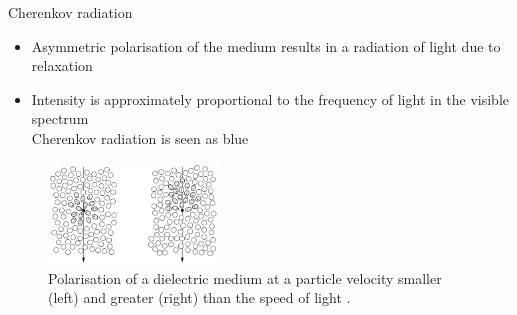 \documentclass[aspectratio=1610, 10pt]{beamer}
\begin{document}
\begin{frame}{Cherenkov radiation}
  \begin{itemize}
    \item Asymmetric polarisation of the medium results in a radiation of light due to relaxation
    \medskip
    \item Intensity is approximately proportional to the frequency of light in the visible spectrum \\
    \rightarrow Cherenkov radiation is seen as blue
    \medskip
  \end{itemize}
  \begin{figure}
    \includegraphics[width=0.4\textwidth]{images/polarisation.png}
    \caption{Polarisation of a dielectric medium at a particle velocity smaller (left) and greater (right) than the speed of light \cite{kolanoski}.}
  \end{figure}
\end{frame}
\end{document}
